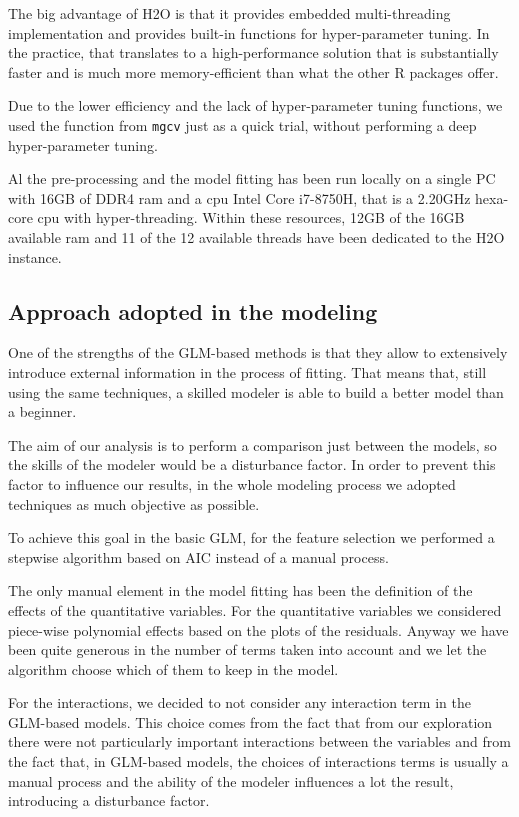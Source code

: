 \documentclass[a4paper, twoside, openright, 12pt]{report}
\theoremstyle{definition}
\theoremstyle{definition}
\theoremstyle{definition}
\theoremstyle{remark}
\begin{document}
The big advantage of H2O is that it provides embedded multi-threading implementation and provides built-in functions for hyper-parameter tuning. In the practice, that translates to a high-performance solution that is substantially faster and is much more memory-efficient than what the other R packages offer.

Due to the lower efficiency and the lack of hyper-parameter tuning functions, we used the function from \texttt{mgcv} just as a quick trial, without performing a deep hyper-parameter tuning.

Al the pre-processing and the model fitting has been run locally on a single PC with 16GB of DDR4 \ac{ram} and a \ac{cpu} Intel Core i7-8750H, that is a 2.20GHz hexa-core \ac{cpu} with hyper-threading. Within these resources, 12GB of the 16GB available \ac{ram} and 11 of the 12 available threads have been dedicated to the H2O instance.

\hypertarget{approach-adopted-in-the-modeling}{%
\subsection{Approach adopted in the modeling}\label{approach-adopted-in-the-modeling}}

One of the strengths of the GLM-based methods is that they allow to extensively introduce external information in the process of fitting. That means that, still using the same techniques, a skilled modeler is able to build a better model than a beginner.

The aim of our analysis is to perform a comparison just between the models, so the skills of the modeler would be a disturbance factor. In order to prevent this factor to influence our results, in the whole modeling process we adopted techniques as much objective as possible.

To achieve this goal in the basic GLM, for the feature selection we performed a stepwise algorithm based on AIC instead of a manual process.

The only manual element in the model fitting has been the definition of the effects of the quantitative variables. For the quantitative variables we considered piece-wise polynomial effects based on the plots of the residuals. Anyway we have been quite generous in the number of terms taken into account and we let the algorithm choose which of them to keep in the model.

For the interactions, we decided to not consider any interaction term in the GLM-based models. This choice comes from the fact that from our exploration there were not particularly important interactions between the variables and from the fact that, in GLM-based models, the choices of interactions terms is usually a manual process and the ability of the modeler influences a lot the result, introducing a disturbance factor.
\end{document}
